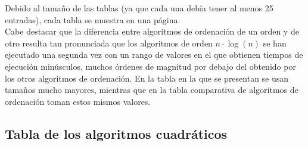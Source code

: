 \documentclass[a4paper, 11pt]{article}
\begin{document}
Debido al tamaño de las tablas (ya que cada una debía tener al menos 25 entradas), cada tabla se muestra en una página. \\

Cabe destacar que la diferencia entre algoritmos de ordenación de un orden y de otro resulta tan pronunciada que los algoritmos de orden $n \cdot \log (n)$ se han ejecutado una segunda vez con un rango de valores en el que obtienen tiempos de ejecución minúsculos, muchos órdenes de magnitud por debajo del obtenido por los otros algoritmos de ordenación. En la tabla en la que se presentan se usan tamaños mucho mayores, mientras que en la tabla comparativa de algoritmos de ordenación toman estos mismos valores.

\subsection{Tabla de los algoritmos cuadráticos}
\end{document}
